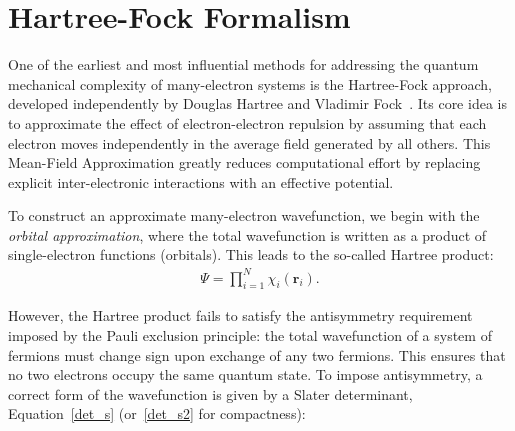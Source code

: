 \newpage
\section{Hartree-Fock Formalism}\label{HF_sec}

One of the earliest and most influential methods for addressing the quantum
mechanical complexity of many-electron systems is the Hartree-Fock approach,
developed independently by Douglas Hartree and Vladimir Fock~\cite{Hartree1928,
Fock1932}. Its core idea is to approximate the effect of electron-electron
repulsion by assuming that each electron moves independently in the average
field generated by all others. This Mean-Field Approximation greatly reduces
computational effort by replacing explicit inter-electronic interactions with an
effective potential.

To construct an approximate many-electron wavefunction, we begin with the
\emph{orbital approximation}, where the total wavefunction is written as a
product of single-electron functions (orbitals). This leads to the so-called
Hartree product:
%
\begin{align}
  \Psi = \prod_{i=1}^N \chi_i (\mathbf{r}_i) .
  \label{Aprox_Orb}
\end{align}

However, the Hartree product fails to satisfy the antisymmetry requirement
imposed by the Pauli exclusion principle: the total wavefunction of a system of
fermions must change sign upon exchange of any two
fermions. This ensures that no two electrons occupy the same quantum state. To
impose antisymmetry, a correct form of the wavefunction is given by a
Slater determinant, Equation~\ref{det_s} (or~\ref{det_s2} for compactness):

{}

